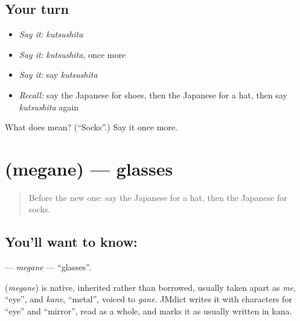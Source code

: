 \subsection*{Your turn}
\begin{itemize}
\raggedright
  \item \emph{Say it:} \emph{kutsushita}
  \item \emph{Say it:} \emph{kutsushita}, once more
  \item \emph{Say it:} say \emph{kutsushita}
  \item \emph{Recall:} say the Japanese for shoes, then the Japanese for a hat, then say \emph{kutsushita} again
\end{itemize}

\begin{tcolorbox}[breakable,colback=teal!4,colframe=teal!35!black,title={Before you move on}]
What does  mean? (\textquotedblleft{}Socks\textquotedblright{}.) Say it once more.
\end{tcolorbox}
\section[\texorpdfstring{\ja{めがね} (megane)}{めがね (megane)}]{ (megane) — glasses}

\label{lesson:JA-C59-megane}



\begin{quote}
Before the new one: say the Japanese for a hat, then the Japanese for socks.
\end{quote}

\subsection*{You'll want to know: }
\textbf{} — \emph{megane} — \textquotedblleft{}glasses\textquotedblright{}.

\begin{cousinweb}
\textbf{} (\emph{megane}) is native, inherited rather than borrowed, usually taken apart as \emph{me}, \textquotedblleft{}eye\textquotedblright{}, and \emph{kane}, \textquotedblleft{}metal\textquotedblright{}, voiced to \emph{gane}. JMdict writes it with characters for \textquotedblleft{}eye\textquotedblright{} and \textquotedblleft{}mirror\textquotedblright{}, read as a whole, and marks it as usually written in kana.
\end{cousinweb}

